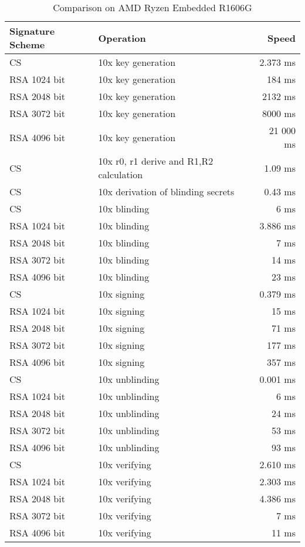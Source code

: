 \begin{table}[ht]
    \centering
    \setupBfhTabular
    \begin{tabular}{llr}
        \rowcolor{BFH-tablehead}
        \textbf{Signature Scheme} & \textbf{Operation} & \textbf{Speed} \\\hline
        CS & 10x key generation & 2.373 ms \\\hline
        RSA 1024 bit & 10x key generation & 184 ms \\\hline
        RSA 2048 bit & 10x key generation & 2132 ms \\\hline
        RSA 3072 bit & 10x key generation & 8000 ms \\\hline
        RSA 4096 bit & 10x key generation & 21 000 ms \\\hline
        \hline
        CS & 10x r0, r1 derive and R1,R2 calculation & 1.09 ms \\\hline
        CS & 10x derivation of blinding secrets & 0.43 ms \\\hline
        CS & 10x blinding & 6 ms \\\hline
        RSA 1024 bit & 10x blinding & 3.886 ms \\\hline
        RSA 2048 bit & 10x blinding & 7 ms \\\hline
        RSA 3072 bit & 10x blinding & 14 ms \\\hline
        RSA 4096 bit & 10x blinding & 23 ms \\\hline
        \hline
        CS & 10x signing & 0.379 ms \\\hline
        RSA 1024 bit & 10x signing & 15 ms \\\hline
        RSA 2048 bit & 10x signing & 71 ms \\\hline
        RSA 3072 bit & 10x signing & 177 ms \\\hline
        RSA 4096 bit & 10x signing & 357 ms \\\hline
        \hline
        CS & 10x unblinding & 0.001 ms \\\hline
        RSA 1024 bit & 10x unblinding & 6 ms \\\hline
        RSA 2048 bit & 10x unblinding & 24 ms \\\hline
        RSA 3072 bit & 10x unblinding & 53 ms \\\hline
        RSA 4096 bit & 10x unblinding & 93 ms \\\hline
        \hline
        CS & 10x verifying & 2.610 ms \\\hline
        RSA 1024 bit & 10x verifying & 2.303 ms \\\hline
        RSA 2048 bit & 10x verifying & 4.386 ms \\\hline
        RSA 3072 bit & 10x verifying & 7 ms \\\hline
        RSA 4096 bit & 10x verifying & 11 ms \\\hline
    \end{tabular}
    \caption{Comparison on AMD Ryzen Embedded R1606G}
    \label{tab:comp-sign-amd-embedded}
\end{table}

